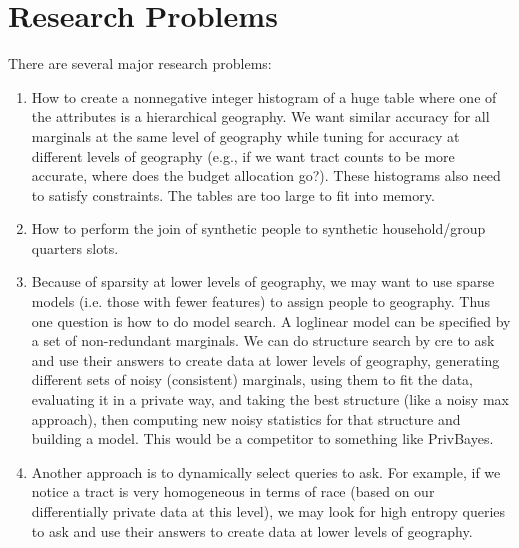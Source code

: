 \documentclass{amsart}
\begin{document}
{

\section{Research Problems}
There are several major research problems:
\begin{enumerate}
\item How to create a nonnegative integer histogram of a huge table where one of the attributes is a hierarchical geography. We want similar accuracy for all marginals at the same level of geography while tuning for accuracy at different levels of geography (e.g., if we want tract counts to be more accurate, where does the budget allocation go?). These histograms also need to satisfy constraints. The tables are too large to fit into memory.
\item How to perform the join of synthetic people to synthetic household/group quarters slots.
\item Because of sparsity at lower levels of geography, we may want to use sparse models (i.e. those with fewer features) to assign people to geography. Thus one question is how to do model search. A loglinear model can be specified by a set of non-redundant marginals. We can do structure search by cre to ask and use their answers to create data at lower levels of geography, generating different sets of noisy (consistent) marginals, using them to fit the data, evaluating it in a private way, and taking the best structure (like a noisy max approach), then computing new noisy statistics for that structure and building a model. This would be a competitor to something like PrivBayes.
\item Another approach is to dynamically select queries to ask. For example, if we notice a tract is very homogeneous in terms of race (based on our differentially private data at this level), we may look for high entropy queries to ask and use their answers to create data at lower levels of geography.
\end{enumerate}

}
\end{document}
